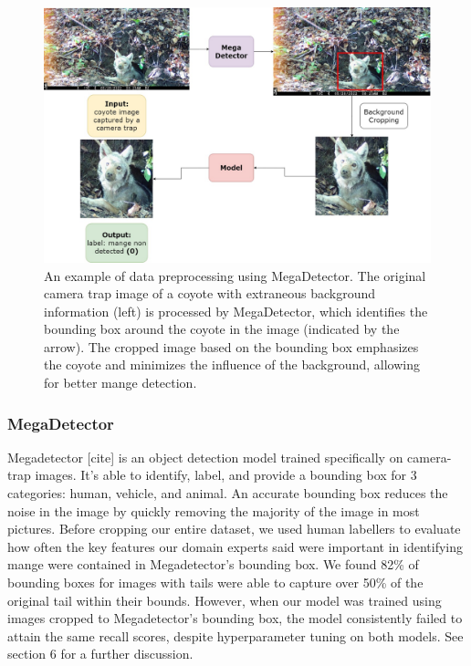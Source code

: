 \documentclass{article}
\begin{document}
\begin{figure}
\centering
\includegraphics[width=1.0\textwidth]{fig3.jpeg}
\caption{\label{fig:fig3}An example of data preprocessing using MegaDetector.
The original camera trap image of a coyote with extraneous background
information (left) is processed by MegaDetector, which identifies the bounding
box around the coyote in the image (indicated by the arrow). The cropped image
based on the bounding box emphasizes the coyote and minimizes the influence of
the background, allowing for better mange detection.}
\end{figure}

\subsubsection{MegaDetector}
Megadetector [cite] is an object detection model trained specifically on
camera-trap images. It’s able to identify, label, and provide a bounding box for
3 categories: human, vehicle, and animal. An accurate bounding box reduces the
noise in the image by quickly removing the majority of the image in most
pictures. Before cropping our entire dataset, we used human labellers to
evaluate how often the key features our domain experts said were important in
identifying mange were contained in Megadetector’s bounding box. We found 82\%
of bounding boxes for images with tails were able to capture over 50\% of the
original tail within their bounds. However, when our model was trained using
images cropped to Megadetector’s bounding box, the model consistently failed to
attain the same recall scores, despite hyperparameter tuning on both models. See
section 6 for a further discussion.
\end{document}
